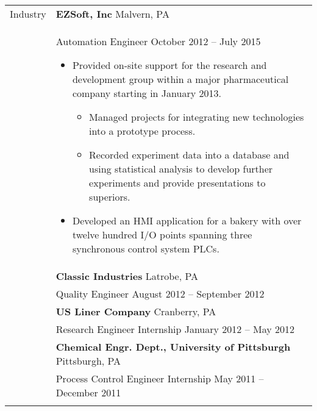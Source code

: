 \documentclass[11pt]{article}
\begin{document}
\begin{tabular}[t]{@{}p{1.15in} @{}p{5.35in}}
{Industry}
&
\textbf{EZSoft, Inc}  \hfill Malvern, PA\vspace{0.015in} \\ &
Automation Engineer \hfill October 2012 -- July 2015\vspace{0.015in}
\begin{itemize}
    \renewcommand{\labelitemi}{$\diamond$}
    \item Provided on-site support for the research and development group within a major pharmaceutical company starting in January 2013.
    \begin{itemize}
    \renewcommand{\labelitemii}{$\cdot$}
        \item Managed projects for integrating new technologies into a prototype process.
        \item Recorded experiment data into a database and using statistical analysis to develop further experiments and provide presentations to superiors.
    \end{itemize}
    \vspace{0.5\baselineskip}
    \item Developed an HMI application for a bakery with over twelve hundred I/O points spanning three synchronous control system PLCs.
\end{itemize}
\\
&
\textbf{Classic Industries}  \hfill Latrobe, PA\vspace{0.015in} \\ &
Quality Engineer \hfill August 2012 -- September 2012\vspace{0.015in}
\vspace{0.5\baselineskip}
\\
&
\textbf{US Liner Company}  \hfill Cranberry, PA\vspace{0.015in} \\ &
Research Engineer Internship \hfill January 2012 -- May 2012\vspace{0.015in}
\vspace{0.5\baselineskip}
\\
&
\textbf{Chemical Engr. Dept., University of Pittsburgh}  \hfill Pittsburgh, PA\vspace{0.015in} \\ &
Process Control Engineer Internship \hfill May 2011 -- December 2011\vspace{0.015in}
\vspace{0.5\baselineskip}
\\
\vspace{0.5\baselineskip}
\\


\end{tabular}
\end{document}
